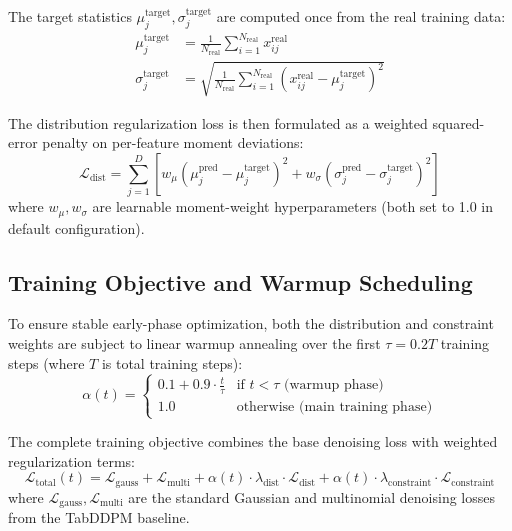 \documentclass[10pt,conference,a4paper]{IEEEtran}
\begin{document}
The target statistics $\mu_j^{\text{target}}, \sigma_j^{\text{target}}$ are computed once from the real training data:
\begin{align}
\mu_j^{\text{target}} &= \frac{1}{N_{\text{real}}}\sum_{i=1}^{N_{\text{real}}} x_{ij}^{\text{real}} \\
\sigma_j^{\text{target}} &= \sqrt{\frac{1}{N_{\text{real}}}\sum_{i=1}^{N_{\text{real}}}(x_{ij}^{\text{real}} - \mu_j^{\text{target}})^2}
\end{align}

The distribution regularization loss is then formulated as a weighted squared-error penalty on per-feature moment deviations:
\begin{equation}
\mathcal{L}_{\text{dist}} = \sum_{j=1}^{D} \left[ w_{\mu} \left( \mu_j^{\text{pred}} - \mu_j^{\text{target}} \right)^2 + w_{\sigma} \left( \sigma_j^{\text{pred}} - \sigma_j^{\text{target}} \right)^2 \right]
\label{eq:dist_reg}
\end{equation}
where $w_{\mu}, w_{\sigma}$ are learnable moment-weight hyperparameters (both set to 1.0 in default configuration).

\subsection{Training Objective and Warmup Scheduling}
To ensure stable early-phase optimization, both the distribution and constraint weights are subject to linear warmup annealing over the first $\tau = 0.2T$ training steps (where $T$ is total training steps):
\begin{equation}
\alpha(t) = \begin{cases}
0.1 + 0.9 \cdot \frac{t}{\tau} & \text{if } t < \tau \text{ (warmup phase)} \\
1.0 & \text{otherwise (main training phase)}
\end{cases}
\label{eq:warmup}
\end{equation}

The complete training objective combines the base denoising loss with weighted regularization terms:
\begin{equation}
\mathcal{L}_{\text{total}}(t) = \mathcal{L}_{\text{gauss}} + \mathcal{L}_{\text{multi}} + \alpha(t) \cdot \lambda_{\text{dist}} \cdot \mathcal{L}_{\text{dist}} + \alpha(t) \cdot \lambda_{\text{constraint}} \cdot \mathcal{L}_{\text{constraint}}
\label{eq:total_loss}
\end{equation}
where $\mathcal{L}_{\text{gauss}}, \mathcal{L}_{\text{multi}}$ are the standard Gaussian and multinomial denoising losses from the TabDDPM baseline.
\end{document}
